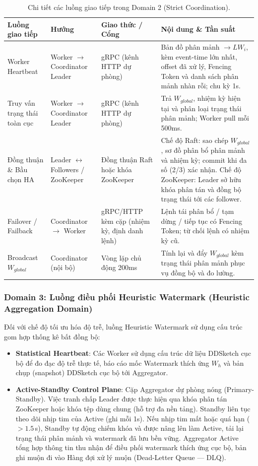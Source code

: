 \documentclass[12pt,a4paper]{article}
\begin{document}
\begin{table}[H]
    \centering
    \small
    \setlength{\tabcolsep}{4pt}
    \begin{tabular}{p{} p{} p{} p{}}
        \toprule
        \textbf{Luồng giao tiếp} & \textbf{Hướng} & \textbf{Giao thức / Cổng} & \textbf{Nội dung \& Tần suất} \\
        \midrule
        Worker Heartbeat & Worker $\to$ Coordinator Leader & gRPC (kênh HTTP dự phòng) & Bản đồ phân mảnh $\to LW_i$, kèm event-time lớn nhất, offset đã xử lý, Fencing Token và danh sách phân mảnh nhàn rỗi; chu kỳ 1s. \\
        Truy vấn trạng thái toàn cục & Worker $\to$ Coordinator Leader & gRPC (kênh HTTP dự phòng) & Trả $W_{global}$, nhiệm kỳ hiện tại và phân loại trạng thái phân mảnh; Worker pull mỗi 500ms. \\
        Đồng thuận \& Bầu chọn HA & Leader $\leftrightarrow$ Followers / ZooKeeper & Đồng thuận Raft hoặc khóa ZooKeeper & Chế độ Raft: sao chép $W_{global}$, sơ đồ phân bổ phân mảnh và nhiệm kỳ; commit khi đa số (2/3) xác nhận. Chế độ ZooKeeper: Leader sở hữu khóa phân tán và đồng bộ trạng thái tới các follower. \\
        Failover / Failback & Coordinator $\to$ Worker & gRPC/HTTP kèm cặp (nhiệm kỳ, định danh lệnh) & Lệnh tái phân bổ / tạm dừng / tiếp tục có Fencing Token; từ chối lệnh có nhiệm kỳ cũ. \\
        Broadcast $W_{global}$ & Coordinator (nội bộ) & Vòng lặp chủ động 200ms & Tính lại và đẩy $W_{global}$ kèm trạng thái phân mảnh phục vụ đồng bộ và đo lường. \\
        \bottomrule
    \end{tabular}
    \caption{Chi tiết các luồng giao tiếp trong Domain 2 (Strict Coordination).}
\end{table}

\subsubsection{Domain 3: Luồng điều phối Heuristic Watermark (Heuristic Aggregation Domain)}
Đối với chế độ tối ưu hóa độ trễ, luồng Heuristic Watermark sử dụng cấu trúc gom hợp thống kê bất đồng bộ:
\begin{itemize}[leftmargin=*]
    \item \textbf{Statistical Heartbeat}: Các Worker sử dụng cấu trúc dữ liệu DDSketch cục bộ để đo đạc độ trễ thực tế, báo cáo mốc Watermark thích ứng $W_h$ và bản chụp (snapshot) DDSketch cục bộ tới Aggregator.
    \item \textbf{Active-Standby Control Plane}: Cặp Aggregator dự phòng nóng (Primary-Standby). Việc tranh chấp Leader được thực hiện qua khóa phân tán ZooKeeper hoặc khóa tệp dùng chung (hỗ trợ đa nền tảng). Standby liên tục theo dõi nhịp tim của Active (ghi mỗi 1s). Nếu nhịp tim mất hoặc quá hạn ($>1.5$\,s), Standby tự động chiếm khóa và được nâng lên làm Active, tải lại trạng thái phân mảnh và watermark đã lưu bền vững. Aggregator Active tổng hợp thông tin thu nhận để điều phối watermark thích ứng cục bộ, bản ghi muộn đi vào Hàng đợi xử lý muộn (Dead-Letter Queue --- DLQ).
\end{itemize}
\end{document}
